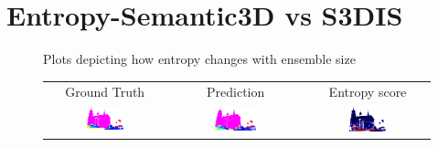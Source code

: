     \section{Entropy-Semantic3D vs S3DIS}
    \label{sec:ent_sem3dvs3dis}
    \begin{figure}[h!]
        \centering
        
        \caption{Plots depicting how entropy changes with ensemble size}
        \label{fig:entropy_sem3dvs3dis}
    \end{figure}
    \begin{figure}[h!]
        \begin{tabular}{ccc}
            Ground Truth & Prediction & Entropy score \\
            \includegraphics[width=0.33\textwidth, height=0.18\textheight]{images/seg_output/sem3d_seg_output/1_GT.png} &
            \includegraphics[width=0.33\textwidth, height=0.18\textheight]{images/seg_output/sem3d_seg_output/1_Pred.png}& 
            \includegraphics[width=0.33\textwidth, height=0.18\textheight]{images/seg_output/sem3d_seg_output/1_Entropy.png}\\


\end{tabular}
\end{figure}
